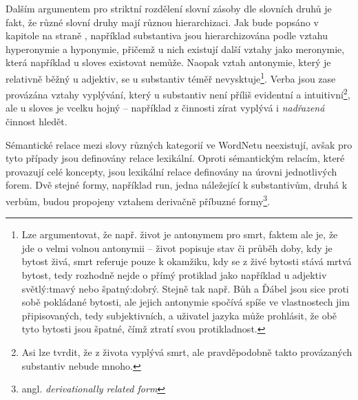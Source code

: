 \documentclass[a4paper, 11pt, oneside]{book}
\newcommand{\itNameRef}[1]{\textit{\nameref{#1}}}
\newcommand\ex{\textsf}
\begin{document}
					Dalším argumentem pro striktní rozdělení slovní zásoby dle slovních druhů je fakt, že různé slovní druhy mají různou hierarchizaci. Jak bude popsáno v kapitole \itNameRef{cha:sem-vztahy} na straně \pageref{cha:sem-vztahy}, například substantiva jsou hierarchizována podle vztahu hyperonymie a hyponymie, přičemž u nich existují další vztahy jako meronymie, která například u sloves existovat nemůže. Naopak vztah antonymie, který je relativně běžný u adjektiv, se u substantiv téměř nevysktuje\footnote{Lze argumentovat, že např. \ex{život} je antonymem pro \ex{smrt}, faktem ale je, že jde o velmi volnou antonymii -- život popisuje stav či průběh doby, kdy je bytost živá, smrt referuje pouze k okamžiku, kdy se z živé bytosti stává mrtvá bytost, tedy rozhodně nejde o přímý protiklad jako například u adjektiv \ex{světlý:tmavý} nebo \ex{špatný:dobrý}. Stejně tak např. \ex{Bůh} a \ex{Ďábel} jsou sice proti sobě pokládané bytosti, ale jejich antonymie spočívá spíše ve vlastnostech jim připisovaných, tedy subjektivních, a uživatel jazyka může prohlásit, že obě tyto bytosti jsou špatné, čímž ztratí svou protikladnost.}. Verba jsou zase provázána vztahy vyplývání, který u substantiv není příliš evidentní a intuitivní\footnote{Asi lze tvrdit, že z \ex{života} vyplývá \ex{smrt}, ale pravděpodobně takto provázaných substantiv nebude mnoho.}, ale u sloves je vcelku hojný -- například z činnosti \ex{zírat} vyplývá i \textit{nadřazená} činnost \ex{hledět}.

					Sémantické relace mezi slovy různých kategorií ve WordNetu neexistují, avšak pro tyto případy jsou definovány relace lexikální. Oproti sémantickým relacím, které provazují celé koncepty, jsou lexikální relace definovány na úrovni jednotlivých forem. Dvě stejné formy, například \ex{run}, jedna náležející k substantivům, druhá k verbům, budou propojeny vztahem derivačně příbuzné formy\footnote{angl. \textit{derivationally related form}}. \parencite{wndocsWNgloss}


\end{document}
